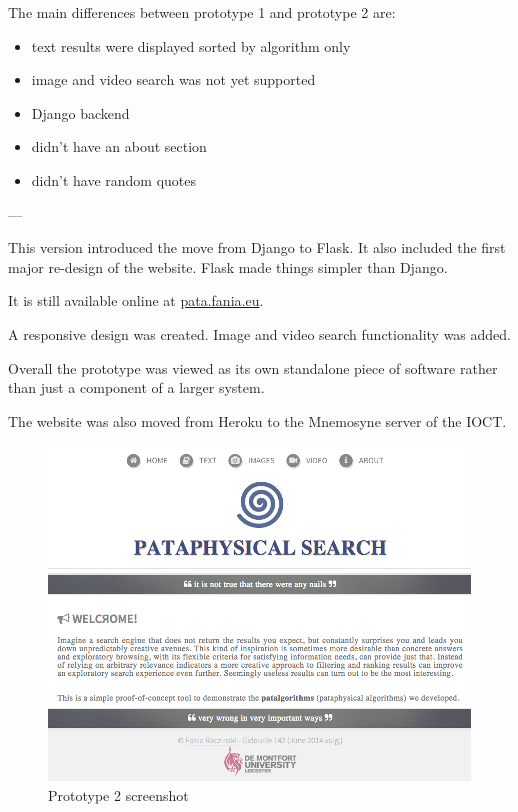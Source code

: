 The main differences between prototype 1 and prototype 2 are:
\begin{itemize}
  \item text results were displayed sorted by algorithm only
  \item image and video search was not yet supported
  \item Django backend
  \item didn't have an about section
  \item didn't have random quotes
\end{itemize}

---

This version introduced the move from Django to Flask. It also included the first major re-design of the website. Flask made things simpler than Django.

It is still available online at \url{pata.fania.eu}.

A responsive design was created.
Image and video search functionality was added.

Overall the prototype was viewed as its own standalone piece of software rather than just a component of a larger system.

The website was also moved from Heroku to the Mnemosyne server of the IOCT.

\begin{figure}[!htbp] %
  \centering
  \includegraphics[width=0.6\linewidth]{images/prototype02}
\caption[Prototype 2 screenshot]{Prototype 2 screenshot}
\label{img:Prototype2x}
\end{figure}


